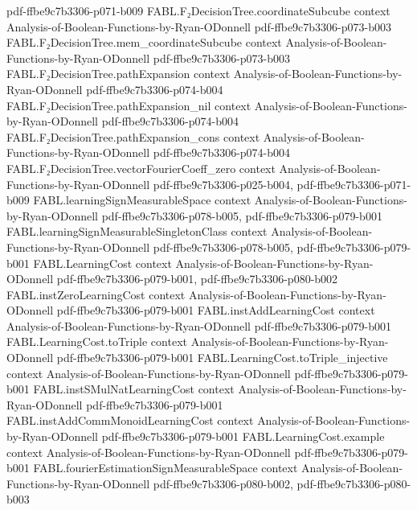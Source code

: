 \begin{theorem}
  {pdf-ffbe9c7b3306-p071-b009}
\proofstep
  {FABL.F₂DecisionTree.coordinateSubcube}
  {context}
  {Analysis-of-Boolean-Functions-by-Ryan-ODonnell}
  {pdf-ffbe9c7b3306-p073-b003}
\proofstep
  {FABL.F₂DecisionTree.mem_coordinateSubcube}
  {context}
  {Analysis-of-Boolean-Functions-by-Ryan-ODonnell}
  {pdf-ffbe9c7b3306-p073-b003}
\proofstep
  {FABL.F₂DecisionTree.pathExpansion}
  {context}
  {Analysis-of-Boolean-Functions-by-Ryan-ODonnell}
  {pdf-ffbe9c7b3306-p074-b004}
\proofstep
  {FABL.F₂DecisionTree.pathExpansion_nil}
  {context}
  {Analysis-of-Boolean-Functions-by-Ryan-ODonnell}
  {pdf-ffbe9c7b3306-p074-b004}
\proofstep
  {FABL.F₂DecisionTree.pathExpansion_cons}
  {context}
  {Analysis-of-Boolean-Functions-by-Ryan-ODonnell}
  {pdf-ffbe9c7b3306-p074-b004}
\proofstep
  {FABL.F₂DecisionTree.vectorFourierCoeff_zero}
  {context}
  {Analysis-of-Boolean-Functions-by-Ryan-ODonnell}
  {pdf-ffbe9c7b3306-p025-b004,
    pdf-ffbe9c7b3306-p071-b009}
\proofstep
  {FABL.learningSignMeasurableSpace}
  {context}
  {Analysis-of-Boolean-Functions-by-Ryan-ODonnell}
  {pdf-ffbe9c7b3306-p078-b005,
    pdf-ffbe9c7b3306-p079-b001}
\proofstep
  {FABL.learningSignMeasurableSingletonClass}
  {context}
  {Analysis-of-Boolean-Functions-by-Ryan-ODonnell}
  {pdf-ffbe9c7b3306-p078-b005,
    pdf-ffbe9c7b3306-p079-b001}
\proofstep
  {FABL.LearningCost}
  {context}
  {Analysis-of-Boolean-Functions-by-Ryan-ODonnell}
  {pdf-ffbe9c7b3306-p079-b001,
    pdf-ffbe9c7b3306-p080-b002}
\proofstep
  {FABL.instZeroLearningCost}
  {context}
  {Analysis-of-Boolean-Functions-by-Ryan-ODonnell}
  {pdf-ffbe9c7b3306-p079-b001}
\proofstep
  {FABL.instAddLearningCost}
  {context}
  {Analysis-of-Boolean-Functions-by-Ryan-ODonnell}
  {pdf-ffbe9c7b3306-p079-b001}
\proofstep
  {FABL.LearningCost.toTriple}
  {context}
  {Analysis-of-Boolean-Functions-by-Ryan-ODonnell}
  {pdf-ffbe9c7b3306-p079-b001}
\proofstep
  {FABL.LearningCost.toTriple_injective}
  {context}
  {Analysis-of-Boolean-Functions-by-Ryan-ODonnell}
  {pdf-ffbe9c7b3306-p079-b001}
\proofstep
  {FABL.instSMulNatLearningCost}
  {context}
  {Analysis-of-Boolean-Functions-by-Ryan-ODonnell}
  {pdf-ffbe9c7b3306-p079-b001}
\proofstep
  {FABL.instAddCommMonoidLearningCost}
  {context}
  {Analysis-of-Boolean-Functions-by-Ryan-ODonnell}
  {pdf-ffbe9c7b3306-p079-b001}
\proofstep
  {FABL.LearningCost.example}
  {context}
  {Analysis-of-Boolean-Functions-by-Ryan-ODonnell}
  {pdf-ffbe9c7b3306-p079-b001}
\proofstep
  {FABL.fourierEstimationSignMeasurableSpace}
  {context}
  {Analysis-of-Boolean-Functions-by-Ryan-ODonnell}
  {pdf-ffbe9c7b3306-p080-b002,
    pdf-ffbe9c7b3306-p080-b003}

\end{theorem}
